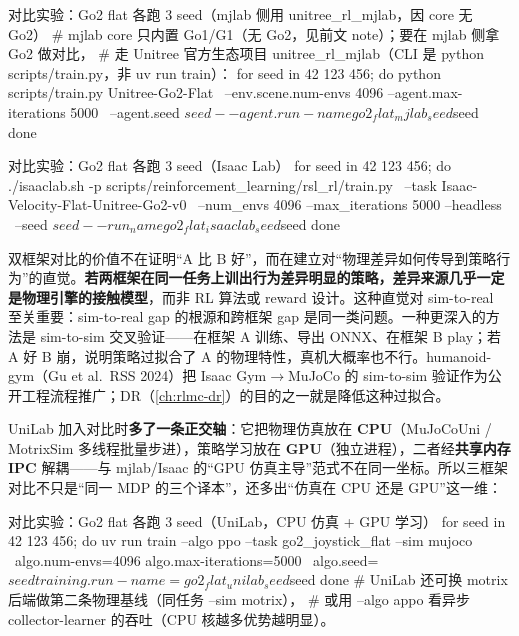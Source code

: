 \begin{codebox}[bash]{对比实验：Go2 flat 各跑 3 seed（mjlab 侧用 unitree\_rl\_mjlab，因 core 无 Go2）}
# mjlab core 只内置 Go1/G1（无 Go2，见前文 note）；要在 mjlab 侧拿 Go2 做对比，
# 走 Unitree 官方生态项目 unitree_rl_mjlab（CLI 是 python scripts/train.py，非 uv run train）：
for seed in 42 123 456; do
  python scripts/train.py Unitree-Go2-Flat \
    --env.scene.num-envs 4096 --agent.max-iterations 5000 \
    --agent.seed ${seed} --agent.run-name go2_flat_mjlab_seed${seed}
done
\end{codebox}

\begin{codebox}[bash]{对比实验：Go2 flat 各跑 3 seed（Isaac Lab）}
for seed in 42 123 456; do
  ./isaaclab.sh -p scripts/reinforcement_learning/rsl_rl/train.py \
    --task Isaac-Velocity-Flat-Unitree-Go2-v0 \
    --num_envs 4096 --max_iterations 5000 --headless \
    --seed ${seed} --run_name go2_flat_isaaclab_seed${seed}
done
\end{codebox}

\begin{insight}[本质：跨框架 gap 与 sim-to-real gap 是同一类问题]\label{ins:rlmc-ql-crossgap}
双框架对比的价值不在证明“A 比 B 好”，而在建立对“物理差异如何传导到策略行为”的直觉。\textbf{若两框架在同一任务上训出行为差异明显的策略，差异来源几乎一定是物理引擎的接触模型}，而非 RL 算法或 reward 设计。这种直觉对 sim-to-real 至关重要：sim-to-real gap 的根源和跨框架 gap 是同一类问题。一种更深入的方法是 sim-to-sim 交叉验证——在框架 A 训练、导出 ONNX、在框架 B play；若 A 好 B 崩，说明策略过拟合了 A 的物理特性，真机大概率也不行。humanoid-gym（Gu et al.\ RSS 2024）把 Isaac Gym$\to$MuJoCo 的 sim-to-sim 验证作为公开工程流程推广；DR（\cref{ch:rlmc-dr}）的目的之一就是降低这种过拟合。
\end{insight}

UniLab 加入对比时\textbf{多了一条正交轴}：它把物理仿真放在 \textbf{CPU}（MuJoCoUni / MotrixSim 多线程批量步进），策略学习放在 \textbf{GPU}（独立进程），二者经\textbf{共享内存 IPC} 解耦——与 mjlab/Isaac 的“GPU 仿真主导”范式不在同一坐标。所以三框架对比不只是“同一 MDP 的三个译本”，还多出“仿真在 CPU 还是 GPU”这一维：

\begin{codebox}[bash]{对比实验：Go2 flat 各跑 3 seed（UniLab，CPU 仿真 + GPU 学习）}
for seed in 42 123 456; do
  uv run train --algo ppo --task go2_joystick_flat --sim mujoco \
    algo.num-envs=4096 algo.max-iterations=5000 \
    algo.seed=${seed} training.run-name=go2_flat_unilab_seed${seed}
done
# UniLab 还可换 motrix 后端做第二条物理基线（同任务 --sim motrix），
# 或用 --algo appo 看异步 collector-learner 的吞吐（CPU 核越多优势越明显）。
\end{codebox}

